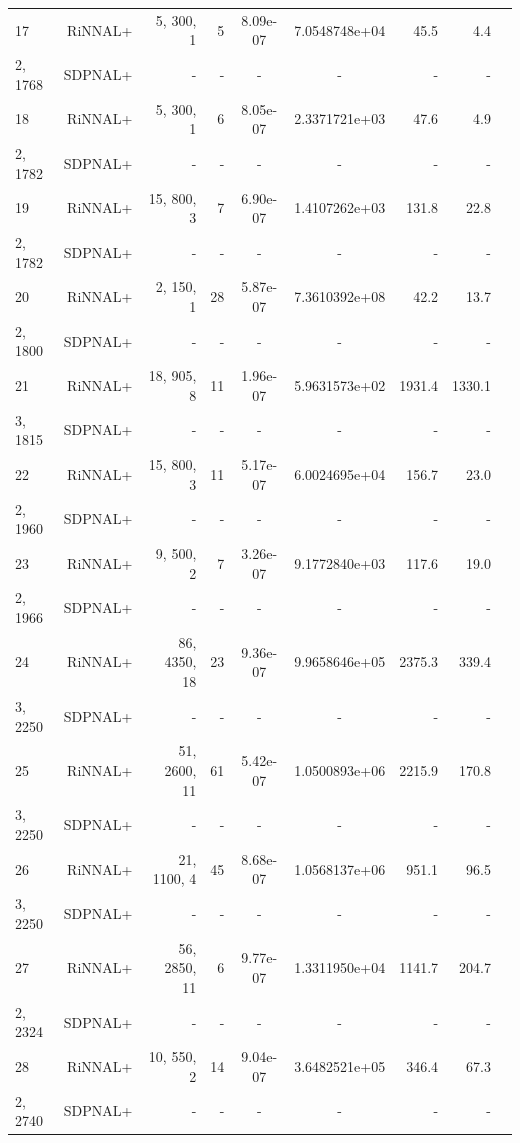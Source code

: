 \documentclass[11pt]{article}
\theoremstyle{plain}
\begin{document}
\begin{footnotesize}
\begin{longtable}[c]{lrrrccrrr}
17& RiNNAL+ & 5, 300, 1 & 5 & 8.09e-07 & 7.0548748e+04 & 45.5 &4.4 \\ 
2, 1768& SDPNAL+ & - & - & - & - & - & - \\ [3pt] 

18& RiNNAL+ & 5, 300, 1 & 6 & 8.05e-07 & 2.3371721e+03 & 47.6 &4.9 \\ 
2, 1782& SDPNAL+ & - & - & - & - & - & - \\ [3pt] 

19& RiNNAL+ & 15, 800, 3 & 7 & 6.90e-07 & 1.4107262e+03 & 131.8 &22.8 \\ 
2, 1782& SDPNAL+ & - & - & - & - & - & - \\ [3pt] 

20& RiNNAL+ & 2, 150, 1 & 28 & 5.87e-07 & 7.3610392e+08 & 42.2 &13.7 \\ 
2, 1800& SDPNAL+ & - & - & - & - & - & - \\ [3pt] 

21& RiNNAL+ & 18, 905, 8 & 11 & 1.96e-07 & 5.9631573e+02 & 1931.4 &1330.1 \\ 
3, 1815& SDPNAL+ & - & - & - & - & - & - \\ [3pt] 

22& RiNNAL+ & 15, 800, 3 & 11 & 5.17e-07 & 6.0024695e+04 & 156.7 &23.0 \\ 
2, 1960& SDPNAL+ & - & - & - & - & - & - \\ [3pt] 

23& RiNNAL+ & 9, 500, 2 & 7 & 3.26e-07 & 9.1772840e+03 & 117.6 &19.0 \\ 
2, 1966& SDPNAL+ & - & - & - & - & - & - \\ [3pt] 

24& RiNNAL+ & 86, 4350, 18 & 23 & 9.36e-07 & 9.9658646e+05 & 2375.3 &339.4 \\ 
3, 2250& SDPNAL+ & - & - & - & - & - & - \\ [3pt] 

25& RiNNAL+ & 51, 2600, 11 & 61 & 5.42e-07 & 1.0500893e+06 & 2215.9 &170.8 \\ 
3, 2250& SDPNAL+ & - & - & - & - & - & - \\ [3pt] 

26& RiNNAL+ & 21, 1100, 4 & 45 & 8.68e-07 & 1.0568137e+06 & 951.1 &96.5 \\ 
3, 2250& SDPNAL+ & - & - & - & - & - & - \\ [3pt] 

27& RiNNAL+ & 56, 2850, 11 & 6 & 9.77e-07 & 1.3311950e+04 & 1141.7 &204.7 \\ 
2, 2324& SDPNAL+ & - & - & - & - & - & - \\ [3pt] 

28& RiNNAL+ & 10, 550, 2 & 14 & 9.04e-07 & 3.6482521e+05 & 346.4 &67.3 \\ 
2, 2740& SDPNAL+ & - & - & - & - & - & - \\ [3pt] 

\end{longtable}
\end{footnotesize}
\end{document}
